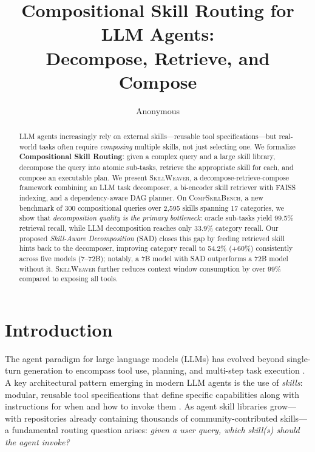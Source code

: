 \documentclass[11pt]{article}
\title{Compositional Skill Routing for LLM Agents:\\Decompose, Retrieve, and Compose}
\author{Anonymous}
\newcommand{\system}{\textsc{SkillWeaver}}
\newcommand{\benchmark}{\textsc{CompSkillBench}}
\begin{document}
\maketitle

\begin{abstract}
LLM agents increasingly rely on external skills---reusable tool specifications---but real-world tasks often require \emph{composing} multiple skills, not just selecting one.
We formalize \textbf{Compositional Skill Routing}: given a complex query and a large skill library, decompose the query into atomic sub-tasks, retrieve the appropriate skill for each, and compose an executable plan.
We present \system{}, a decompose-retrieve-compose framework combining an LLM task decomposer, a bi-encoder skill retriever with FAISS indexing, and a dependency-aware DAG planner.
On \benchmark{}, a new benchmark of 300 compositional queries over 2{,}595 skills spanning 17 categories, we show that \emph{decomposition quality is the primary bottleneck}: oracle sub-tasks yield 99.5\% retrieval recall, while LLM decomposition reaches only 33.9\% category recall.
Our proposed \emph{Skill-Aware Decomposition} (SAD) closes this gap by feeding retrieved skill hints back to the decomposer, improving category recall to 54.2\% (+60\%) consistently across five models (7--72B); notably, a 7B model with SAD outperforms a 72B model without it.
\system{} further reduces context window consumption by over 99\% compared to exposing all tools.
\end{abstract}

\section{Introduction}
\label{sec:intro}

The agent paradigm for large language models (LLMs) has evolved beyond single-turn generation to encompass tool use, planning, and multi-step task execution \cite{schick2023toolformer,qin2023toolllm,patil2023gorilla}.
A key architectural pattern emerging in modern LLM agents is the use of \emph{skills}: modular, reusable tool specifications that define specific capabilities along with instructions for when and how to invoke them \cite{anthropic2025skills}.
As agent skill libraries grow---with repositories already containing thousands of community-contributed skills---a fundamental routing question arises: \emph{given a user query, which skill(s) should the agent invoke?}
\end{document}
